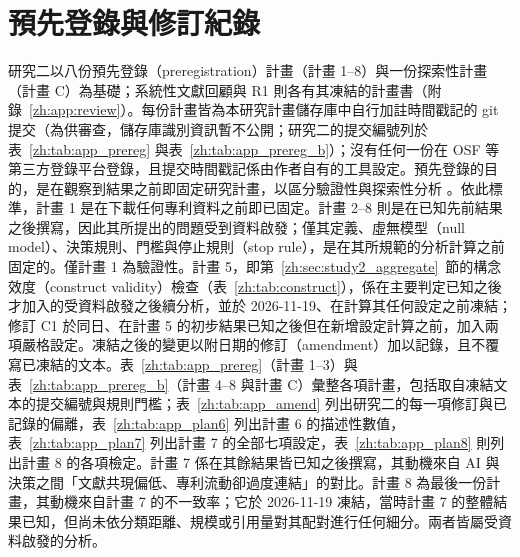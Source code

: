
\chapter{預先登錄與修訂紀錄}
\label{zh:app:prereg}

研究二以八份預先登錄（preregistration）計畫（計畫 1--8）與一份探索性計畫（計畫 C）為基礎；系統性文獻回顧與 R1 則各有其凍結的計畫書（附錄~\ref{zh:app:review}）。每份計畫皆為本研究計畫儲存庫中自行加註時間戳記的 git 提交（為供審查，儲存庫識別資訊暫不公開；研究二的提交編號列於表~\ref{zh:tab:app_prereg} 與表~\ref{zh:tab:app_prereg_b}）；沒有任何一份在 OSF 等第三方登錄平台登錄，且提交時間戳記係由作者自有的工具設定。預先登錄的目的，是在觀察到結果之前即固定研究計畫，以區分驗證性與探索性分析 \citep{nosek2018preregistration}。依此標準，計畫 1 是在下載任何專利資料之前即已固定。計畫 2--8 則是在已知先前結果之後撰寫，因此其所提出的問題受到資料啟發；僅其定義、虛無模型（null model）、決策規則、門檻與停止規則（stop rule），是在其所規範的分析計算之前固定的。僅計畫 1 為驗證性。計畫 5，即第~\ref{zh:sec:study2_aggregate}~節的構念效度（construct validity）檢查（表~\ref{zh:tab:construct}），係在主要判定已知之後才加入的受資料啟發之後續分析，並於 2026-11-19、在計算其任何設定之前凍結；修訂 C1 於同日、在計畫 5 的初步結果已知之後但在新增設定計算之前，加入兩項嚴格設定。凍結之後的變更以附日期的修訂（amendment）加以記錄，且不覆寫已凍結的文本。表~\ref{zh:tab:app_prereg}（計畫 1--3）與表~\ref{zh:tab:app_prereg_b}（計畫 4--8 與計畫 C）彙整各項計畫，包括取自凍結文本的提交編號與規則門檻；表~\ref{zh:tab:app_amend} 列出研究二的每一項修訂與已記錄的偏離，表~\ref{zh:tab:app_plan6} 列出計畫 6 的描述性數值，表~\ref{zh:tab:app_plan7} 列出計畫 7 的全部七項設定，表~\ref{zh:tab:app_plan8} 則列出計畫 8 的各項檢定。計畫 7 係在其餘結果皆已知之後撰寫，其動機來自 AI 與決策之間「文獻共現偏低、專利流動卻過度連結」的對比。計畫 8 為最後一份計畫，其動機來自計畫 7 的不一致率；它於 2026-11-19 凍結，當時計畫 7 的整體結果已知，但尚未依分類距離、規模或引用量對其配對進行任何細分。兩者皆屬受資料啟發的分析。

